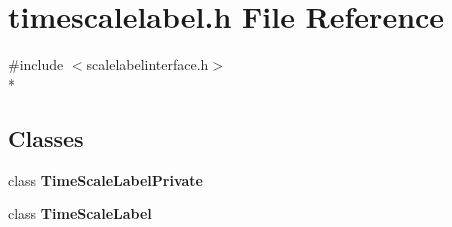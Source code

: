 \section{timescalelabel.\+h File Reference}
\label{bk3_2scalelabels_2timescalelabel_8h}
{\ttfamily \#include $<$scalelabelinterface.\+h$>$}\\*
\subsection*{Classes}
\begin{DoxyCompactItemize}
\item 
class {\bf Time\+Scale\+Label\+Private}
\item 
class {\bf Time\+Scale\+Label}
\end{DoxyCompactItemize}
